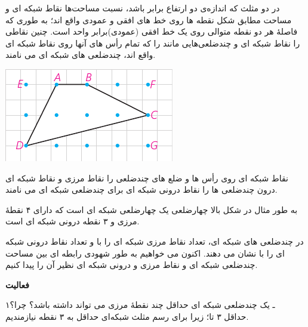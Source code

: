 \documentclass[12pt, a4paper]{book}
\begin{document}
	  \begin{minipage}{0.7\textwidth}
در دو مثلث که اندازه‌ی دو ارتفاع برابر باشد، نسبت مساحت‌ها
نقاط شبکه ای و مساحت مطابق شکل نقطه ها روی خط های افقی و عمودی واقع اند؛ به طوری که فاصلهٔ هر دو نقطه متوالی روی یک خط افقی (عمودی)برابر واحد است. چنین نقاطی را نقاط شبکه ای و چندضلعی‌هایی مانند
را که تمام رأس های آنها روی نقاط شبکه ای واقع اند، چندضلعی های شبکه ای می نامند.
\end{minipage}   
\begin{minipage}{.3\textwidth}
	\begin{flushleft}
		\includegraphics{"Shapes/Fasl - 3/Dars 2/P69-S1.pdf"}
	\end{flushleft}
\end{minipage}

نقاط شبکه ای روی رأس ها و ضلع های چندضلعی را نقاط مرزی و نقاط شبکه ای درون چندضلعی ها را نقاط درونی شبکه ای برای چندضلعی شبکه ای می نامند.

به طور مثال در شکل بالا چهارضلعی 
یک چهارضلعی شبکه ای است که دارای ۴ نقطهٔ مرزی و ٣ نقطه درونی شبکه ای است.
\bigskip

در چندضلعی های شبکه ای، تعداد نقاط مرزی شبکه ای را با
و تعداد نقاط درونی شبکه ای را با
نشان می دهند. اکنون می خواهیم به طور شهودی رابطه ای بین مساحت چندضلعی شبکه ای و نقاط مرزی و درونی شبکه ای نظیر آن را پیدا کنیم.
\bigskip

\textbf{فعالیت}

۱ـ یک چندضلعی شبکه ای حداقل چند نقطهٔ مرزی می تواند داشته باشد؟ چرا؟ \\
حداقل ۳ تا؛ زیرا برای رسم مثلث شبکه‌ای حداقل به ۳ نقطه نیازمندیم.
\end{document}
